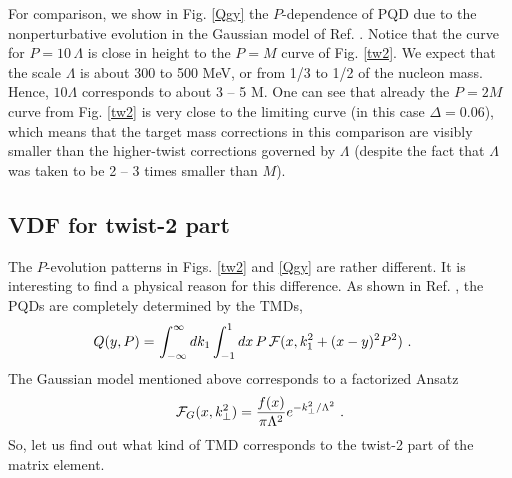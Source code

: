 \documentclass[final,5p,times,twocolumn]{elsarticle}
\begin{document}
For comparison, we show in Fig. \ref{Qgy} the $P$-dependence of PQD due to the nonperturbative
evolution in the  Gaussian  model of Ref. \cite{Radyushkin:2016hsy}.
Notice that the curve for $P=10\,  \Lambda$ is close in height  to the $P= M$ curve of
Fig. \ref{tw2}. 
We expect that the scale $\Lambda$ is about 300 to 500 MeV, or from 1/3 to 1/2 of the nucleon mass.
Hence, $10 \Lambda$ corresponds to about 3 -- 5 M.  One can see that 
already the $P=2M$ curve  from Fig. \ref{tw2}  
is very close to the limiting curve (in this case $\Delta =0.06$), which means that the 
target mass corrections 
in this comparison are visibly  smaller than the  higher-twist corrections governed by $\Lambda$
(despite the fact that $\Lambda$  was taken to be 2 -- 3 times smaller than $M$). 




\subsection{VDF  for twist-2 part}


The $P$-evolution patterns in Figs. \ref{tw2} and \ref{Qgy}  are rather different.
It is interesting to find a physical reason   for  this difference.  
As shown in Ref. \cite{Radyushkin:2016hsy}, the PQDs are completely determined by 
the TMDs,
 \begin{align}
 Q(y, P)  =  & \,\int_{-\infty}^{\infty} d  k_1
   \int_{-1}^1 dx\, P\,  {\cal F} (x, k_1^2+(x -y)^2 P^2 )
  \ . 
 \label{QTMD}
\end{align} 
The Gaussian  model  mentioned above corresponds to 
a  factorized Ansatz 
  \begin{align}
{\cal F} _G (x, k_\perp^2) = \frac{f (x)}{\pi \Lambda^2}  e^{-k_\perp^2/\Lambda^2} \ . 
\label{Gaussian}
\end{align} 
So, let us find out what kind of TMD corresponds 
to the twist-2 part of the matrix element. 
\end{document}
